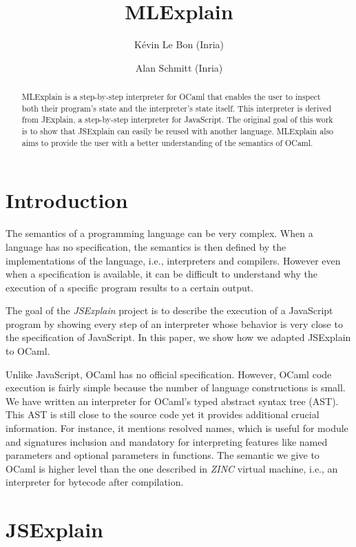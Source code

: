 \documentclass[twocolumn,a4paper]{article} \usepackage[utf8]{inputenc}
\author{ K\'evin Le Bon (Inria) \and Alan Schmitt (Inria) } \title{MLExplain}
\date{}
\begin{document}
\maketitle

\begin{abstract}
  MLExplain is a step-by-step interpreter for OCaml that enables the user to
  inspect both their program's state and the interpreter's state itself. This
  interpreter is derived from JExplain, a step-by-step interpreter for
  JavaScript. The original goal of this work is to show that JSExplain can
  easily be reused with another language. MLExplain also aims to provide the
  user with a better understanding of the semantics of OCaml.
\end{abstract}

\section{Introduction}

The semantics of a programming language can be very complex. When a language
has no specification, the semantics is then defined by the implementations of
the language, i.e., interpreters and compilers. However even when a
specification is available, it can be difficult to understand why the execution
of a specific program results to a certain output.

The goal of the \emph{JSExplain} project \cite{chargueraud:hal-01745792} is to
describe the execution of a JavaScript program by showing every step of an
interpreter whose behavior is very close to the specification of JavaScript. In
this paper, we show how we adapted JSExplain to OCaml.

Unlike JavaScript, OCaml has no official specification. However, OCaml code
execution is fairly simple because the number of language constructions is
small. We have written an interpreter for OCaml's typed abstract syntax tree
(AST). This AST is still close to the source code yet it provides additional
crucial information. For instance, it mentions resolved names, which is useful
for module and signatures inclusion and mandatory for interpreting features like
named parameters and optional parameters in functions. The semantic we give to
OCaml is higher level than the one described in \emph{ZINC} \cite{Leroy-ZINC}
virtual machine, i.e., an interpreter for bytecode after compilation.

\section{JSExplain}
\end{document}
